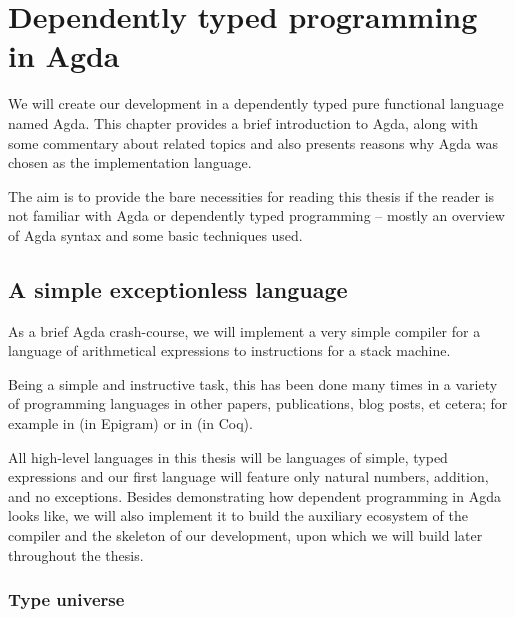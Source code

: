 \chapter{Dependently typed programming in Agda}
\label{chap:dependent-types}

We will create our development in a dependently typed pure functional language named Agda.
This chapter provides a brief introduction to Agda, along with some commentary about
related topics and also presents reasons why Agda was chosen as the implementation language.


The aim is to provide the bare necessities for reading this thesis if the reader is not
familiar with Agda or dependently typed programming -- mostly an overview of Agda syntax and some
basic techniques used.


\section{A simple exceptionless language}
\label{sec:simple-language}

As a brief Agda crash-course, we will implement a very simple compiler for a
language of arithmetical expressions to instructions for a stack machine.

Being a simple and instructive task, this has been done many times in a variety
of programming languages in other papers, publications, blog posts, et cetera;
for example in \cite{epigram-compiler} (in Epigram) or in \cite{chlipala:compiler}
(in Coq).

All high-level languages in this thesis will be languages of simple, typed
expressions and our first language will feature only natural numbers, addition,
and no exceptions. Besides demonstrating how dependent programming in Agda
looks like, we will also implement it to build the auxiliary ecosystem of the
compiler and the skeleton of our development, upon which we will build later
throughout the thesis.



\subsection{Type universe}

